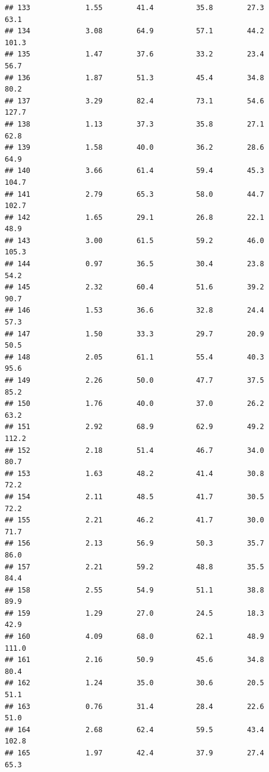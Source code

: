 \documentclass[
]{book}
\theoremstyle{definition}
\theoremstyle{definition}
\theoremstyle{definition}
\theoremstyle{definition}
\theoremstyle{remark}
\begin{document}
\begin{verbatim}
## 133             1.55        41.4          35.8        27.3             63.1
## 134             3.08        64.9          57.1        44.2            101.3
## 135             1.47        37.6          33.2        23.4             56.7
## 136             1.87        51.3          45.4        34.8             80.2
## 137             3.29        82.4          73.1        54.6            127.7
## 138             1.13        37.3          35.8        27.1             62.8
## 139             1.58        40.0          36.2        28.6             64.9
## 140             3.66        61.4          59.4        45.3            104.7
## 141             2.79        65.3          58.0        44.7            102.7
## 142             1.65        29.1          26.8        22.1             48.9
## 143             3.00        61.5          59.2        46.0            105.3
## 144             0.97        36.5          30.4        23.8             54.2
## 145             2.32        60.4          51.6        39.2             90.7
## 146             1.53        36.6          32.8        24.4             57.3
## 147             1.50        33.3          29.7        20.9             50.5
## 148             2.05        61.1          55.4        40.3             95.6
## 149             2.26        50.0          47.7        37.5             85.2
## 150             1.76        40.0          37.0        26.2             63.2
## 151             2.92        68.9          62.9        49.2            112.2
## 152             2.18        51.4          46.7        34.0             80.7
## 153             1.63        48.2          41.4        30.8             72.2
## 154             2.11        48.5          41.7        30.5             72.2
## 155             2.21        46.2          41.7        30.0             71.7
## 156             2.13        56.9          50.3        35.7             86.0
## 157             2.21        59.2          48.8        35.5             84.4
## 158             2.55        54.9          51.1        38.8             89.9
## 159             1.29        27.0          24.5        18.3             42.9
## 160             4.09        68.0          62.1        48.9            111.0
## 161             2.16        50.9          45.6        34.8             80.4
## 162             1.24        35.0          30.6        20.5             51.1
## 163             0.76        31.4          28.4        22.6             51.0
## 164             2.68        62.4          59.5        43.4            102.8
## 165             1.97        42.4          37.9        27.4             65.3

\end{verbatim}
\end{document}
